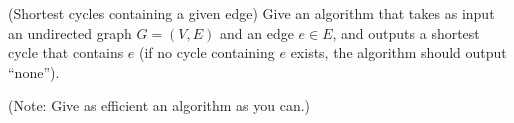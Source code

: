 \begin{questions}
  \newpage
  
  \question[15] (Shortest cycles containing a given edge) Give an
  algorithm that takes as input an undirected graph $G = (V, E)$ and
  an edge $e \in E$, and outputs a shortest cycle that contains $e$
  (if no cycle containing $e$ exists, the algorithm should output
  ``none'').

  (Note: Give as efficient an algorithm as you can.)

  
\end{questions}



